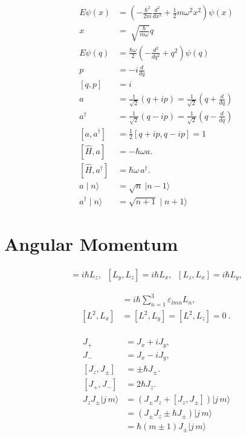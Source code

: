 \documentclass[10pt,a4paper,twocolumn]{article}
\begin{document}
\begin{align*}
E\psi (x) &= \left(-{\frac {\hbar ^{2}}{2m}}{\frac {d^{2}}{dx^{2}}}+{\frac {1}{2}}m\omega ^{2}x^{2}\right)\psi (x) \\
x\ &=\ {\sqrt {\frac {\hbar }{m\omega }}}q \\
E\psi (q) &= {\frac {\hbar \omega }{2}}\left(-{\frac {d^{2}}{dq^{2}}}+q^{2}\right)\psi (q)  \\
p &= - i \frac{d}{dq} \\
 [q, p] &= i \, \\
 a &= \frac{1}{\sqrt{2}}(q + i p) = \frac{1}{\sqrt{2}}\left( q + \frac{d}{dq}\right) \\ 
a^{\dagger } &={\frac {1}{\sqrt {2}}}(q-ip)={\frac {1}{\sqrt {2}}}\left(q-{\frac {d}{dq}}\right) \\
[a,a^{\dagger }]& ={\frac {1}{2}}[q+ip,q-ip]=1 \\
[\hat H, a ]  &= -\hbar \omega a. \\
[{\hat {H}},a^{\dagger }] &= \hbar \omega \, a^\dagger . \\
a\mid n\rangle &={\sqrt {n}}\ |n-1\rangle  \\ 
a^{\dagger }\mid n\rangle &={\sqrt {n+1}}\mid n+1\rangle
\end{align*}

\section{Angular Momentum}

\begin{align*}
[L_{x},L_{y}]=i\hbar L_{z},\;\;[L_{y},L_{z}]=i\hbar L_{x},\;\;[L_{z},L_{x}]=i\hbar L_{y},
\end{align*}

\begin{align*}
[L_{l},L_{m}]&=i\hbar \sum _{n=1}^{3}\varepsilon _{lmn}L_{n}, \\
[L^{2},L_{x}]&=[L^{2},L_{y}]=[L^{2},L_{z}]=0~.\, \\
\end{align*}

\begin{align*}
J_{+}&=J_{x}+iJ_{y},\quad  \\
J_{-}&=J_{x}-iJ_{y},\quad  \\
\left[J_{z},J_{\pm }\right]&=\pm \hbar J_{\pm }.\quad \\
\left[J_{+},J_{-}\right]&=2\hbar J_{z}.\quad \\
J_{z}J_{\pm }|j\,m\rangle &=\left(J_{\pm }J_{z}+\left[J_{z},J_{\pm }\right]\right)|j\,m\rangle \\&=\left(J_{\pm }J_{z}\pm \hbar J_{\pm }\right)|j\,m\rangle \\&=\hbar \left(m\pm 1\right)J_{\pm }|j\,m\rangle 
\end{align*}
\end{document}
